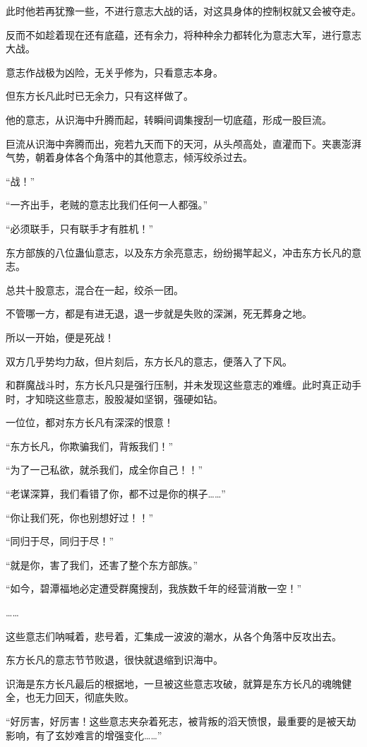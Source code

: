 \begin{this_body}
此时他若再犹豫一些，不进行意志大战的话，对这具身体的控制权就又会被夺走。

反而不如趁着现在还有底蕴，还有余力，将种种余力都转化为意志大军，进行意志大战。

意志作战极为凶险，无关乎修为，只看意志本身。

但东方长凡此时已无余力，只有这样做了。

他的意志，从识海中升腾而起，转瞬间调集搜刮一切底蕴，形成一股巨流。

巨流从识海中奔腾而出，宛若九天而下的天河，从头颅高处，直灌而下。夹裹澎湃气势，朝着身体各个角落中的其他意志，倾泻绞杀过去。

“战！”

“一齐出手，老贼的意志比我们任何一人都强。”

“必须联手，只有联手才有胜机！”

东方部族的八位蛊仙意志，以及东方余亮意志，纷纷揭竿起义，冲击东方长凡的意志。

总共十股意志，混合在一起，绞杀一团。

不管哪一方，都是有进无退，退一步就是失败的深渊，死无葬身之地。

所以一开始，便是死战！

双方几乎势均力敌，但片刻后，东方长凡的意志，便落入了下风。

和群魔战斗时，东方长凡只是强行压制，并未发现这些意志的难缠。此时真正动手时，才知晓这些意志，股股凝如坚钢，强硬如钻。

一位位，都对东方长凡有深深的恨意！

“东方长凡，你欺骗我们，背叛我们！”

“为了一己私欲，就杀我们，成全你自己！！”

“老谋深算，我们看错了你，都不过是你的棋子……”

“你让我们死，你也别想好过！！”

“同归于尽，同归于尽！”

“就是你，害了我们，还害了整个东方部族。”

“如今，碧潭福地必定遭受群魔搜刮，我族数千年的经营消散一空！”

……

这些意志们呐喊着，悲号着，汇集成一波波的潮水，从各个角落中反攻出去。

东方长凡的意志节节败退，很快就退缩到识海中。

识海是东方长凡最后的根据地，一旦被这些意志攻破，就算是东方长凡的魂魄健全，也无力回天，彻底失败。

“好厉害，好厉害！这些意志夹杂着死志，被背叛的滔天愤恨，最重要的是被天劫影响，有了玄妙难言的增强变化……”


\end{this_body}
